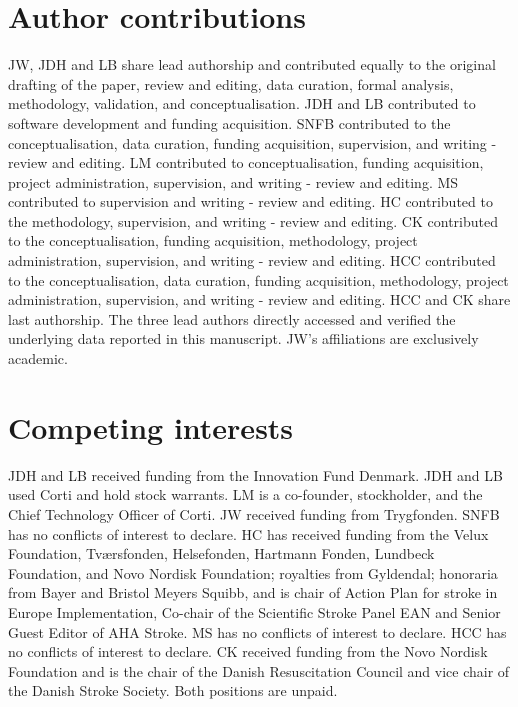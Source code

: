 {\section*{Author contributions}

JW, JDH and LB share lead authorship and contributed equally to the original drafting of the paper, review and editing, data curation, formal analysis, methodology, validation, and conceptualisation. JDH and LB contributed to software development and funding acquisition. SNFB contributed to the conceptualisation, data curation, funding acquisition, supervision, and writing - review and editing. LM contributed to conceptualisation, funding acquisition, project administration, supervision, and writing - review and editing. MS contributed to supervision and writing - review and editing. HC contributed to the methodology, supervision, and writing - review and editing. CK contributed to the conceptualisation, funding acquisition, methodology, project administration, supervision, and writing - review and editing. HCC contributed to the conceptualisation, data curation, funding acquisition, methodology, project administration, supervision, and writing - review and editing. HCC and CK share last authorship. The three lead authors directly accessed and verified the underlying data reported in this manuscript. JW's affiliations are exclusively academic.


\section*{Competing interests}
JDH and LB received funding from the Innovation Fund Denmark. JDH and LB used Corti and hold stock warrants. LM is a co-founder, stockholder, and the Chief Technology Officer of Corti. JW received funding from Trygfonden. SNFB has no conflicts of interest to declare. HC has received funding from the Velux Foundation, Tværsfonden, Helsefonden, Hartmann Fonden, Lundbeck Foundation, and Novo Nordisk Foundation; royalties from Gyldendal; honoraria from Bayer and Bristol Meyers Squibb, and is chair of Action Plan for stroke in Europe Implementation, Co-chair of the Scientific Stroke Panel EAN and Senior Guest Editor of AHA Stroke. MS has no conflicts of interest to declare. HCC has no conflicts of interest to declare. CK received funding from the Novo Nordisk Foundation and is the chair of the Danish Resuscitation Council and vice chair of the Danish Stroke Society. Both positions are unpaid. 


}
